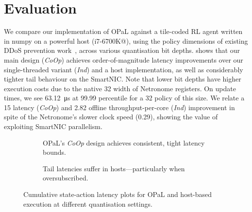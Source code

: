 \documentclass[
sigconf,natbib=false
]{acmart}
\newcommand{\approachshort}{OPaL}
\newcommand{\Coopfw}{\emph{CoOp}}
\newcommand{\coopfw}{\Coopfw}
\newcommand{\Indfw}{\emph{Ind}}
\newcommand{\indfw}{\Indfw}
\begin{document}
\section{Evaluation}
We compare our implementation of \approachshort{} against a tile-coded RL agent written in numpy on a powerful host (i7-6700K@), using the policy dimensions of existing DDoS prevention work~\parencite{DBLP:journals/tnsm/SimpsonRP20}, across various quantisation bit depths.
 shows that our main design (\coopfw) achieves order-of-magnitude latency improvements over our single-threaded variant (\indfw) and a host implementation, as well as considerably tighter tail behaviour on the SmartNIC.
Note that lower bit depths have higher execution costs due to the native \qty{32}{\bit} width of Netronome registers.
On update times, we see \qty{63.12}{\micro\second} at 99.99 percentile for a \qty{32}{\bit} policy of this size.
We relate a \qty{15}{\texttimes} latency (\coopfw) and \qty{2.82}{\texttimes} offline throughput-per-core (\indfw) improvement in spite of the Netronome's slower clock speed (\qty{0.29}{\texttimes}), showing the value of exploiting SmartNIC parallelism.

\begin{figure}
	\centering
	\begin{subfigure}{0.45\linewidth}
		\caption{\approachshort's \Coopfw{} design achieves consistent, tight latency bounds.}
	\end{subfigure}
	\hspace{0.05\linewidth}
	\begin{subfigure}{0.45\linewidth}
		\caption{Tail latencies suffer in hosts---particularly when oversubscribed.}
	\end{subfigure}
	\caption{Cumulative state-action latency plots for \approachshort{} and host-based execution at different quantisation settings.\label{fig:lat-cumul}}
\end{figure}
\end{document}
